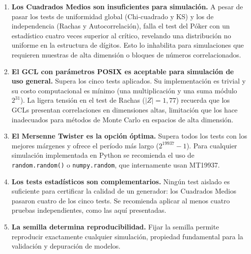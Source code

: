 \documentclass{article}
\begin{document}
\begin{enumerate}

  \item \textbf{Los Cuadrados Medios son insuficientes para simulación.}
        A pesar de pasar los tests de uniformidad global (Chi-cuadrado y
        KS) y los de independencia (Rachas y Autocorrelación), falla el
        test del Póker con un estadístico cuatro veces superior al crítico,
        revelando una distribución no uniforme en la estructura de dígitos.
        Esto lo inhabilita para simulaciones que requieren muestras de
        alta dimensión o bloques de números correlacionados.

  \item \textbf{El GCL con parámetros POSIX es aceptable para simulación
        de uso general.}  Supera los cinco tests aplicados.  Su
        implementación es trivial y su costo computacional es mínimo
        (una multiplicación y una suma módulo $2^{31}$).  La ligera
        tensión en el test de Rachas ($|Z|=1{,}77$) recuerda que los
        GCLs presentan correlaciones en dimensiones altas, limitación
        que los hace inadecuados para métodos de Monte Carlo en espacios
        de alta dimensión.

  \item \textbf{El Mersenne Twister es la opción óptima.}  Supera todos
        los tests con los mejores márgenes y ofrece el período más largo
        ($2^{19937}-1$).  Para cualquier simulación implementada en Python
        se recomienda el uso de \texttt{random.random()} o
        \texttt{numpy.random}, que internamente usan MT19937.

  \item \textbf{Los tests estadísticos son complementarios.}  Ningún test
        aislado es suficiente para certificar la calidad de un generador:
        los Cuadrados Medios pasaron cuatro de los cinco tests.  Se
        recomienda aplicar al menos cuatro pruebas independientes, como
        las aquí presentadas.

  \item \textbf{La semilla determina reproducibilidad.}  Fijar la semilla
        permite reproducir exactamente cualquier simulación, propiedad
        fundamental para la validación y depuración de modelos.

\end{enumerate}
\end{document}
